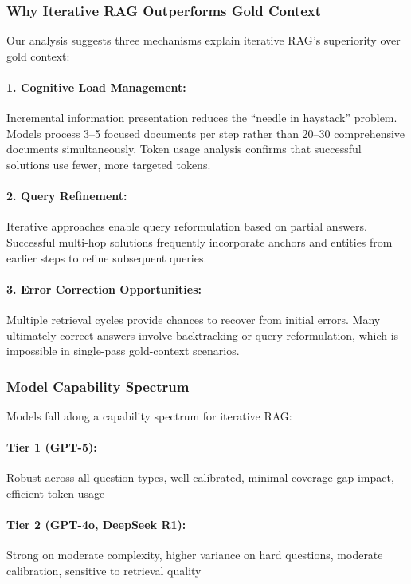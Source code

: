 \subsubsection{Why Iterative RAG Outperforms Gold Context}

Our analysis suggests three mechanisms explain iterative RAG's superiority over gold context:

\paragraph{1. Cognitive Load Management:} Incremental information presentation reduces the ``needle in haystack'' problem. Models process 3--5 focused documents per step rather than 20--30 comprehensive documents simultaneously. Token usage analysis confirms that successful solutions use fewer, more targeted tokens.

\paragraph{2. Query Refinement:} Iterative approaches enable query reformulation based on partial answers. Successful multi-hop solutions frequently incorporate anchors and entities from earlier steps to refine subsequent queries.

\paragraph{3. Error Correction Opportunities:} Multiple retrieval cycles provide chances to recover from initial errors. Many ultimately correct answers involve backtracking or query reformulation, which is impossible in single-pass gold-context scenarios.

\subsubsection{Model Capability Spectrum}

Models fall along a capability spectrum for iterative RAG:

\paragraph{Tier 1 (GPT-5):} Robust across all question types, well-calibrated, minimal coverage gap impact, efficient token usage

\paragraph{Tier 2 (GPT-4o, DeepSeek R1):} Strong on moderate complexity, higher variance on hard questions, moderate calibration, sensitive to retrieval quality

